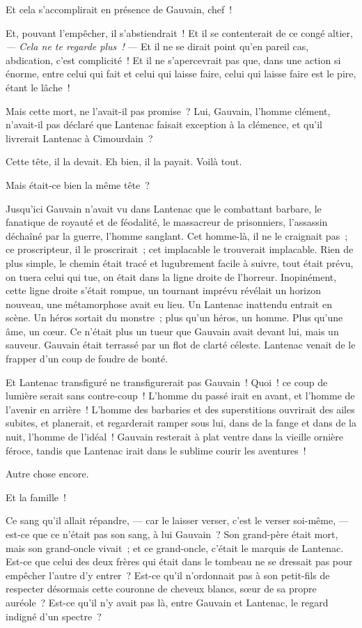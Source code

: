 \documentclass[french,twoside]{book} %
\begin{document}
Et cela s’accomplirait en présence de Gauvain, chef !\par
Et, pouvant l’empêcher, il s’abstiendrait ! Et il se contenterait de ce congé altier, \emph{ — Cela ne te regarde plus !} — Et il ne se dirait point qu’en pareil cas, abdication, c’est complicité ! Et il ne s’apercevrait pas que, dans une action si énorme, entre celui qui fait et celui qui laisse faire, celui qui laisse faire est le pire, étant le lâche !\par
Mais cette mort, ne l’avait-il pas promise ? Lui, Gauvain, l’homme clément, n’avait-il pas déclaré que Lantenac faisait exception à la clémence, et qu’il livrerait Lantenac à Cimourdain ?\par
Cette tête, il la devait. Eh bien, il la payait. Voilà tout.\par
Mais était-ce bien la même tête ?\par
Jusqu’ici Gauvain n’avait vu dans Lantenac que le  combattant barbare, le fanatique de royauté et de féodalité, le massacreur de prisonniers, l’assassin déchaîné par la guerre, l’homme sanglant. Cet homme-là, il ne le craignait pas ; ce proscripteur, il le proscrirait ; cet implacable le trouverait implacable. Rien de plus simple, le chemin était tracé et lugubrement facile à suivre, tout était prévu, on tuera celui qui tue, on était dans la ligne droite de l’horreur. Inopinément, cette ligne droite s’était rompue, un tournant imprévu révélait un horizon nouveau, une métamorphose avait eu lieu. Un Lantenac inattendu entrait en scène. Un héros sortait du monstre ; plus qu’un héros, un homme. Plus qu’une âme, un cœur. Ce n’était plus un tueur que Gauvain avait devant lui, mais un sauveur. Gauvain était terrassé par un flot de clarté céleste. Lantenac venait de le frapper d’un coup de foudre de bonté.\par
Et Lantenac transfiguré ne transfigurerait pas Gauvain ! Quoi ! ce coup de lumière serait sans contre-coup ! L’homme du passé irait en avant, et l’homme de l’avenir en arrière ! L’homme des barbaries et des superstitions ouvrirait des ailes subites, et planerait, et regarderait ramper sous lui, dans de la fange et dans de la nuit, l’homme de l’idéal ! Gauvain resterait à plat ventre dans la vieille ornière féroce, tandis que Lantenac irait dans le sublime courir les aventures !\par
Autre chose encore.\par
Et la famille !\par
Ce sang qu’il allait répandre, — car le laisser verser, c’est le verser soi-même, — est-ce que ce n’était pas son sang, à lui Gauvain ? Son grand-père était  mort, mais son grand-oncle vivait ; et ce grand-oncle, c’était le marquis de Lantenac. Est-ce que celui des deux frères qui était dans le tombeau ne se dressait pas pour empêcher l’autre d’y entrer ? Est-ce qu’il n’ordonnait pas à son petit-fils de respecter désormais cette couronne de cheveux blancs, sœur de sa propre auréole ? Est-ce qu’il n’y avait pas là, entre Gauvain et Lantenac, le regard indigné d’un spectre ?\par
\end{document}
